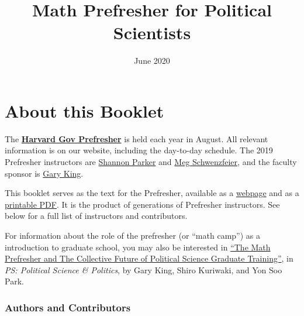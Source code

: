 \documentclass[
]{book}
\title{Math Prefresher for Political Scientists}
\author{}
\date{\vspace{-2.5em}June 2020}
\theoremstyle{definition}
\theoremstyle{definition}
\theoremstyle{definition}
\theoremstyle{remark}
\begin{document}
\maketitle

{
\setcounter{tocdepth}{1}
\tableofcontents
}
\hypertarget{about-this-booklet}{%
\chapter*{About this Booklet}\label{about-this-booklet}}

The \href{https://projects.iq.harvard.edu/prefresher}{\textbf{Harvard Gov Prefresher}} is held each year in August. All relevant information is on our website, including the day-to-day schedule. The 2019 Prefresher instructors are \href{https://wcfia.harvard.edu/shannon-lynn-parker}{Shannon Parker} and \href{http://schwenzfeier.github.io/}{Meg Schwenzfeier}, and the faculty sponsor is \href{https://gking.harvard.edu}{Gary King}.

This booklet serves as the text for the Prefresher, available as a \href{https://iqss.github.io/prefresher/}{webpage} and as a \href{https://github.com/IQSS/prefresher/releases}{printable PDF}. It is the product of generations of Prefresher instructors. See below for a full list of instructors and contributors.

For information about the role of the prefresher (or ``math camp'') as a introduction to graduate school, you may also be interested in \href{https://gking.harvard.edu/prefresher}{``The Math Prefresher and The Collective Future of Political Science Graduate Training''}, in \emph{PS: Political Science \& Politics}, by Gary King, Shiro Kuriwaki, and Yon Soo Park.

\hypertarget{authors-and-contributors}{%
\subsection*{Authors and Contributors}\label{authors-and-contributors}}
\end{document}
